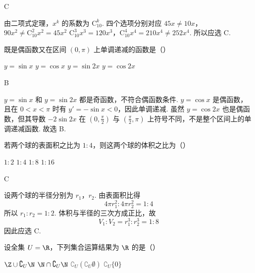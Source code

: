 \begin{answer}
C
\end{answer}

\begin{solution}
由二项式定理，\(x^k\) 的系数为 \(\mathrm C_{10}^{k}\). 四个选项分别对应
\(45x\ne10x\)，\(90x^2\ne\mathrm C_{10}^{2}x^2=45x^2\)
\(\mathrm C_{10}^{3}x^3=120x^3\)，\(\mathrm C_{10}^{4}x^4=210x^4\ne252x^4\).
所以应选 C.
\end{solution}

\begin{problem}
既是偶函数又在区间 \( (0, \pi) \) 上单调递减的函数是（\quad）

\choices
    {\( y = \sin x \)}
    {\( y = \cos x \)}
    {\( y = \sin 2x \)}
    {\( y = \cos 2x \)}
\end{problem}

\begin{answer}
B
\end{answer}

\begin{solution}
\(y=\sin x\) 和 \(y=\sin2x\) 都是奇函数，不符合偶函数条件. \(y=\cos x\) 是偶函数，且在 \(0<x<\pi\) 时有 \(y'=-\sin x<0\)，因此单调递减. 虽然 \(y=\cos2x\) 也是偶函数，但其导数 \(-2\sin2x\) 在 \((0,\frac\pi2)\) 与 \((\frac\pi2,\pi)\) 上符号不同，不是整个区间上的单调递减函数. 故选 B.
\end{solution}

\begin{problem}
若两个球的表面积之比为 \(1:4\)，则这两个球的体积之比为（\quad）

\choices
    {\(1:2\)}
    {\(1:4\)}
    {\(1:8\)}
    {\(1:16\)}
\end{problem}

\begin{answer}
C
\end{answer}

\begin{solution}
设两个球的半径分别为 \(r_1\)，\(r_2\). 由表面积比得
\[
4\pi r_1^2:4\pi r_2^2=1:4
\]
所以 \(r_1:r_2=1:2\). 体积与半径的三次方成正比，故
\[
V_1:V_2=r_1^3:r_2^3=1:8
\]
因此应选 C.
\end{solution}

\begin{problem}
设全集 \( U = \R \)，下列集合运算结果为 \( \R \) 的是（\quad）

\choices
    {\( \Z \cup \complement_U \N \)}
    {\( \N \cap \complement_U \N \)}
    {\( \complement_U (\complement_U \emptyset) \)}
    {\( \complement_U \{0\} \)}
\end{problem}

